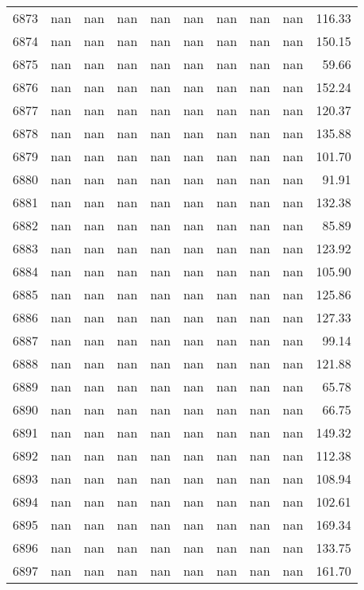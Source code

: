 \begin{tabular}{lrrrrrrrrr}
6873 & nan & nan & nan & nan & nan & nan & nan & nan & 116.33 \\
6874 & nan & nan & nan & nan & nan & nan & nan & nan & 150.15 \\
6875 & nan & nan & nan & nan & nan & nan & nan & nan & 59.66 \\
6876 & nan & nan & nan & nan & nan & nan & nan & nan & 152.24 \\
6877 & nan & nan & nan & nan & nan & nan & nan & nan & 120.37 \\
6878 & nan & nan & nan & nan & nan & nan & nan & nan & 135.88 \\
6879 & nan & nan & nan & nan & nan & nan & nan & nan & 101.70 \\
6880 & nan & nan & nan & nan & nan & nan & nan & nan & 91.91 \\
6881 & nan & nan & nan & nan & nan & nan & nan & nan & 132.38 \\
6882 & nan & nan & nan & nan & nan & nan & nan & nan & 85.89 \\
6883 & nan & nan & nan & nan & nan & nan & nan & nan & 123.92 \\
6884 & nan & nan & nan & nan & nan & nan & nan & nan & 105.90 \\
6885 & nan & nan & nan & nan & nan & nan & nan & nan & 125.86 \\
6886 & nan & nan & nan & nan & nan & nan & nan & nan & 127.33 \\
6887 & nan & nan & nan & nan & nan & nan & nan & nan & 99.14 \\
6888 & nan & nan & nan & nan & nan & nan & nan & nan & 121.88 \\
6889 & nan & nan & nan & nan & nan & nan & nan & nan & 65.78 \\
6890 & nan & nan & nan & nan & nan & nan & nan & nan & 66.75 \\
6891 & nan & nan & nan & nan & nan & nan & nan & nan & 149.32 \\
6892 & nan & nan & nan & nan & nan & nan & nan & nan & 112.38 \\
6893 & nan & nan & nan & nan & nan & nan & nan & nan & 108.94 \\
6894 & nan & nan & nan & nan & nan & nan & nan & nan & 102.61 \\
6895 & nan & nan & nan & nan & nan & nan & nan & nan & 169.34 \\
6896 & nan & nan & nan & nan & nan & nan & nan & nan & 133.75 \\
6897 & nan & nan & nan & nan & nan & nan & nan & nan & 161.70 \\

\end{tabular}
